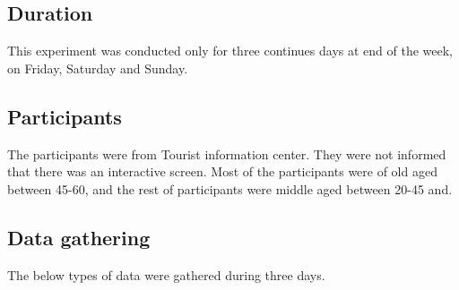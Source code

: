 \subsection{Duration}
This experiment was conducted only for three continues days at end of the week, on Friday, Saturday and Sunday.

\subsection{Participants}
The participants were from Tourist information center. They were not informed that there was an interactive screen. Most of the participants were of old aged between 45-60, and the rest of participants were middle aged between 20-45 and. 

\subsection{Data gathering}
The below types of data were gathered during three days.

